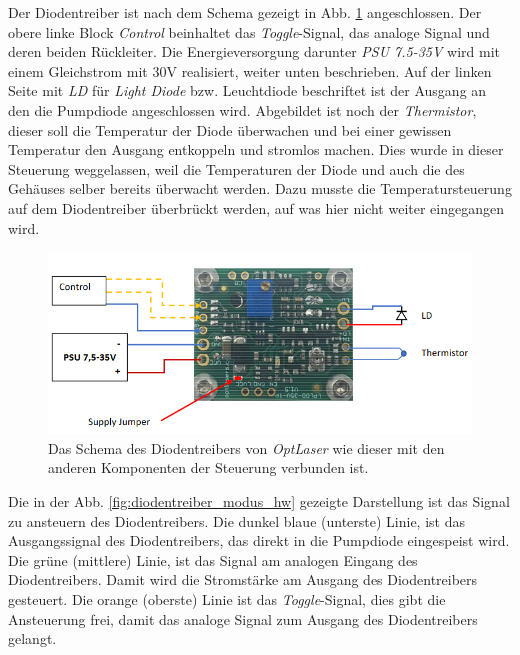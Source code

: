 Der Diodentreiber ist nach dem Schema gezeigt in Abb. \ref{fig:diodentreiber_schema_hw} angeschlossen. Der obere linke Block \textit{Control} beinhaltet das \textit{Toggle}-Signal, das analoge Signal und deren beiden Rückleiter. Die Energieversorgung darunter \textit{PSU 7.5-35V} wird mit einem Gleichstrom mit 30V realisiert, weiter unten beschrieben. Auf der linken Seite mit \textit{LD} für \textit{Light Diode}  bzw. Leuchtdiode beschriftet ist der Ausgang an den die Pumpdiode angeschlossen wird. Abgebildet ist noch der \textit{Thermistor}, dieser soll die Temperatur der Diode überwachen und bei einer gewissen Temperatur den Ausgang entkoppeln und stromlos machen. Dies wurde in dieser Steuerung weggelassen, weil die Temperaturen der Diode und auch die des Gehäuses selber bereits überwacht werden. Dazu musste die Temperatursteuerung auf dem Diodentreiber überbrückt werden, auf was hier nicht weiter eingegangen wird.

\begin{figure}[H]
    \centering
    \includegraphics[scale=0.6, trim={0mm 0mm 0mm 0mm}, clip]{98_images/ldd_schema_connections.PNG}
    \caption{Das Schema des Diodentreibers von \textit{OptLaser} wie dieser mit den anderen Komponenten der Steuerung verbunden ist.}
    \label{fig:diodentreiber_schema_hw}
\end{figure}

Die in der Abb. \ref{fig:diodentreiber_modus_hw} gezeigte Darstellung ist das Signal zu ansteuern des Diodentreibers. Die dunkel blaue (unterste) Linie, ist das Ausgangssignal des Diodentreibers, das direkt in die Pumpdiode eingespeist wird. Die grüne (mittlere) Linie, ist das Signal am analogen Eingang des Diodentreibers. Damit wird die Stromstärke am Ausgang des Diodentreibers gesteuert. Die orange (oberste) Linie ist das \textit{Toggle}-Signal, dies gibt die Ansteuerung frei, damit das analoge Signal zum Ausgang des Diodentreibers gelangt.

